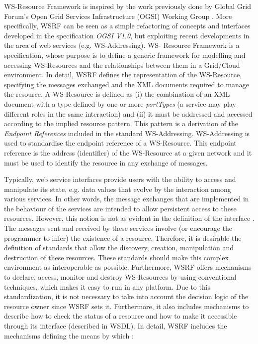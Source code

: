 WS-Resource Framework is inspired by the work previously done by Global Grid Forum's 
Open Grid Services Infrastructure (OGSI) Working Group \cite{Foster03}. More specifically,
WSRF can be seen as a simple refactoring of concepts and interfaces 
developed in the specification \emph{OGSI V1.0}, but
exploiting recent developments in the area of web services (e.g. WS-Addressing). 
WS- Resource Framework \cite{BAN06} is a specification, whose purpose is to define a 
generic framework for modelling and accessing WS-Resources and the relationships 
between them in a Grid/Cloud environment. In detail, WSRF defines 
the representation of the WS-Resource, specifying the messages exchanged and 
the XML documents required to manage the resource. 
A WS-Resource is defined as (i) the combination of an XML document with a type defined
by one or more \emph{portTypes} (a service may play different roles in the same interaction) and (ii) it must 
be addressed and accessed according to the implied resource pattern. This pattern is a derivation 
of the \emph{Endpoint References} included in the standard WS-Addressing. 
WS-Addressing is used to standardise the endpoint reference  of a WS-Resource. This endpoint
reference is the address (identifier) of the WS-Resource at
a given network and it must be used to identify the resource in any exchange of messages. 

Typically, web service interfaces provide users with the ability to access and manipulate its state, e.g. data values
that evolve by the interaction among various services. In other words, 
the message exchanges that are implemented in the behaviour of the services 
are intended to allow persistent access to these resources. However, this notion is not 
as evident in the definition of the interface \cite{Fost04}. The messages sent and received 
by these services involve (or encourage the programmer to infer) the existence of a resource. 
Therefore, it is desirable the definition of standards that allow the discovery, 
creation, manipulation and destruction of these resources. These standards should make this 
complex environment as interoperable as possible. Furthermore, 
WSRF offers mechanisms to declare, access, monitor and destroy WS-Resources by using conventional techniques, 
which makes it easy to run in any platform. Due to this standardization, 
it is not necessary to take into account the decision logic of the resource owner since WSRF sets it.
Furthermore, it also includes mechanisms to describe how to check the status of a resource 
and how to make it accessible through its interface (described in WSDL). 
In detail, WSRF includes the mechanisms defining the means by which \cite{WSRFstandard}:

